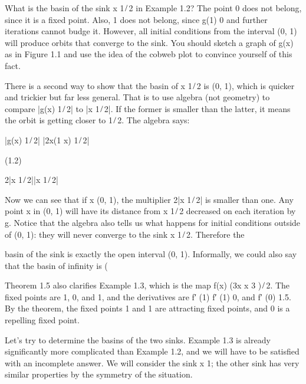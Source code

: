 What is the basin of the sink x  1 ̸ 2 in Example 1.2? The point 0 does not belong, since it is a ﬁxed 
point. Also, 1 does not belong, since g(1)  0 and further iterations cannot budge it. However, all initial 
conditions from the interval (0, 1) will produce orbits that converge to the sink. You should sketch a 
graph of g(x) as in Figure 1.1 and use the idea of the cobweb plot to convince yourself of this fact.

There is a second way to show that the basin of x  1 ̸ 2 is (0, 1), which is quicker and trickier but far 
less general. That is to use algebra (not geometry) to compare |g(x)  1 ̸ 2| to |x  1 ̸ 2|. If the former is 
smaller than the latter, it means the orbit is getting closer to 1 ̸ 2. The algebra says:

|g(x)  1 ̸ 2|  |2x(1  x)  1 ̸ 2|

(1.2)

 2|x  1 ̸ 2||x  1 ̸ 2|

Now we can see that if x  (0, 1), the multiplier 2|x  1 ̸ 2| is smaller than one. Any point x in (0, 1) will 
have its distance from x  1 ̸ 2 decreased on each iteration by g. Notice that the algebra also tells us what 
happens for initial conditions outside of (0, 1): they will never converge to the sink x  1 ̸ 2. Therefore 
the


basin of the sink is exactly the open interval (0, 1). Informally, we could also say that the basin of 
inﬁnity is (


Theorem 1.5 also clariﬁes Example 1.3, which is the map f(x)  (3x  x 3 ) ̸ 2. The ﬁxed points are 1, 0, 
and 1, and the derivatives are f′ (1)  f′ (1)  0, and f′ (0)  1.5. By the theorem, the ﬁxed points 1 and 1 
are attracting ﬁxed points, and 0 is a repelling ﬁxed point.

Let’s try to determine the basins of the two sinks. Example 1.3 is already signiﬁcantly more complicated 
than Example 1.2, and we will have to be satisﬁed with an incomplete answer. We will consider the sink x  
1; the other sink has very similar properties by the symmetry of the situation.

